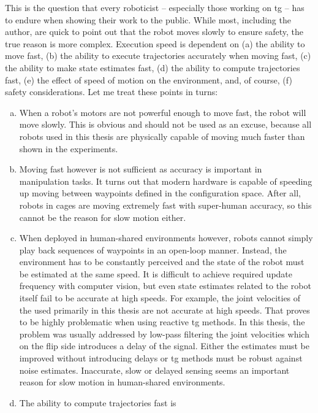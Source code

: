 This is the question that every roboticist
-- especially those working on \ac{tg} --
has to endure when showing their work to the public. While most, including the
author, are quick to point out that the robot moves slowly to ensure safety, the
true reason is more complex. Execution speed is dependent on
(a) the ability to move fast,
(b) the ability to execute trajectories accurately when moving fast,
(c) the ability to make state estimates fast,
(d) the ability to compute trajectories fast,
(e) the effect of speed of motion on the environment,
and, of course,  (f) safety considerations.
Let me treat these
points in turns:
\begin{enumerate}[(a)]
  \item When a robot's motors are not powerful enough to
    move fast, the robot will move slowly. This is obvious and
    should not be used as an excuse, because all robots used
    in this thesis are physically capable of moving much faster than
    shown in the experiments. 
  \item Moving fast however is not sufficient as accuracy
    is important in manipulation tasks. It turns out
    that modern hardware is capable of speeding up
    moving between waypoints defined in the configuration
    space. After all,
    robots in cages are moving extremely fast with
    super-human accuracy, so this cannot be the reason for
    slow motion either.
  \item When deployed in human-shared environments however,
    robots cannot simply play back sequences of waypoints in
    an open-loop manner. Instead, the environment has to be
    constantly perceived and the state of the robot must be
    estimated at the same speed. It is difficult
    to achieve required update frequency with computer
    vision, but even state estimates related to the robot
    itself fail to be accurate at high speeds. For example,
    the joint velocities of the \panda{} used primarily
    in this thesis are not accurate at high speeds. That
    proves to be highly problematic when using reactive
    \ac{tg} methods. In this thesis, the problem was usually
    addressed by low-pass filtering the joint velocities
    which on the flip side introduces a delay of the signal.
    Either the estimates must be improved without
    introducing delays or \ac{tg} methods must be robust
    against noise estimates. Inaccurate, slow or delayed
    sensing seems an important reason for slow motion in
    human-shared environments.
  \item The ability to compute trajectories fast is

\end{enumerate}
